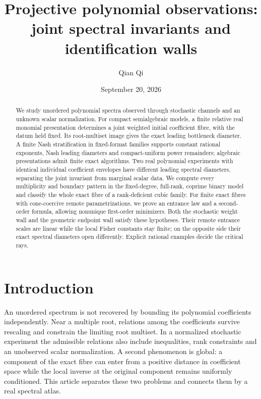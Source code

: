 
\title[Joint spectral invariants and identification walls]{Projective polynomial observations:\\ joint spectral invariants and identification walls}
\author{Qian Qi}
\date{September 20, 2026}

\begin{abstract}
We study unordered polynomial spectra observed through stochastic channels
and an unknown scalar normalization. For compact semialgebraic models,
a finite relative real monomial presentation determines a joint weighted
initial coefficient fibre, with the datum held fixed. Its root-multiset
image gives the exact leading bottleneck diameter. A finite Nash
stratification in fixed-format families supports constant rational
exponents, Nash leading diameters and compact-uniform power remainders;
algebraic presentations admit finite exact algorithms. Two real polynomial
experiments with identical individual coefficient envelopes have different
leading spectral diameters, separating the joint invariant from marginal
scalar data. We compute every multiplicity and boundary pattern in the
fixed-degree, full-rank, coprime binary model and classify the whole exact
fibre of a rank-deficient cubic family. For finite exact fibres with
cone-coercive remote parametrizations, we prove an entrance law and a
second-order formula, allowing nonunique first-order minimizers. Both the
stochastic weight wall and the geometric endpoint wall satisfy these
hypotheses. Their remote entrance scales are linear while the local Fisher
constants stay finite; on the opposite side their exact spectral diameters
open differently. Explicit rational examples decide the critical rays.
\end{abstract}
\maketitle

\section{Introduction}
An unordered spectrum is not recovered by bounding its polynomial
coefficients independently. Near a multiple root, relations among the
coefficients survive rescaling and constrain the limiting root multiset.
In a normalized stochastic experiment the admissible relations also
include inequalities, rank constraints and an unobserved scalar
normalization. A second phenomenon is global: a component of the exact
fibre can enter from a positive distance in coefficient space while the
local inverse at the original component remains uniformly conditioned.
This article separates these two problems and connects them by a real
spectral atlas.

